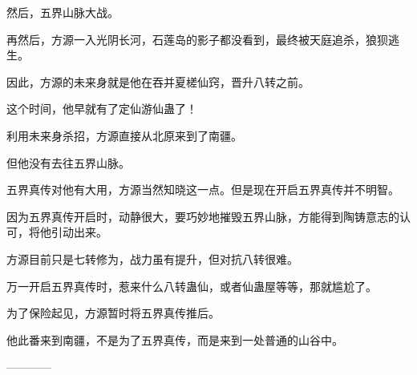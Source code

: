 \begin{this_body}
然后，五界山脉大战。

再然后，方源一入光阴长河，石莲岛的影子都没看到，最终被天庭追杀，狼狈逃生。

因此，方源的未来身就是他在吞并夏槎仙窍，晋升八转之前。

这个时间，他早就有了定仙游仙蛊了！

利用未来身杀招，方源直接从北原来到了南疆。

但他没有去往五界山脉。

五界真传对他有大用，方源当然知晓这一点。但是现在开启五界真传并不明智。

因为五界真传开启时，动静很大，要巧妙地摧毁五界山脉，方能得到陶铸意志的认可，将他引动出来。

方源目前只是七转修为，战力虽有提升，但对抗八转很难。

万一开启五界真传时，惹来什么八转蛊仙，或者仙蛊屋等等，那就尴尬了。

为了保险起见，方源暂时将五界真传推后。

他此番来到南疆，不是为了五界真传，而是来到一处普通的山谷中。

------------

\end{this_body}

